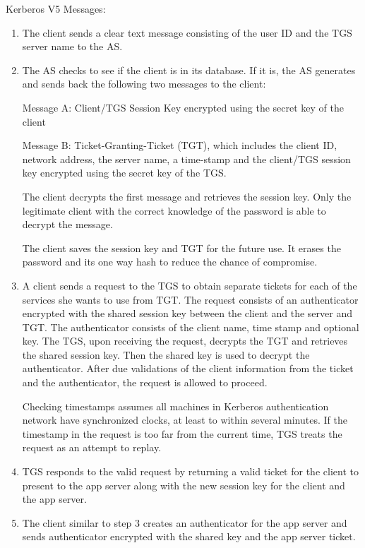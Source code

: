 \begin{multicols}{2}
Kerberos V5 Messages:
\begin{enumerate}
\item The client sends a clear text message consisting of the user ID and the TGS server name to the AS.
\item The AS checks to see if the client is in its database. If it is, the AS generates and sends back the following two messages to the client:

Message A: Client/TGS Session Key encrypted using the secret key of the client

Message B: Ticket-Granting-Ticket (TGT), which includes the client ID, network address, the server name, a time-stamp and the client/TGS session key encrypted using the secret key of the TGS.

The client decrypts the first message and retrieves the session key. Only the legitimate client with the correct knowledge of the password is able to decrypt the message.

The client saves the session key and TGT for the future use. It erases the password and its one way hash to reduce the chance of compromise.

\item A client sends a request to the TGS to obtain separate tickets for each of the services she wants to use from TGT. The request consists of an authenticator encrypted with the shared session key between the client and the server and TGT. The authenticator consists of the client name, time stamp and optional key. The TGS, upon receiving the request, decrypts the TGT and retrieves the shared session key. Then the shared key is used to decrypt the authenticator. After due validations of the client information from the ticket and the authenticator, the request is allowed to proceed.

Checking timestamps assumes all machines in Kerberos authentication network have synchronized clocks, at least to within several minutes. If the timestamp in the request is too far from the current time, TGS treats the request as an attempt to replay.

\item TGS responds to the valid request by returning a valid ticket for the client to present to the app server along with the new session key for the client and the app server.

\item The client similar to step 3 creates an authenticator for the app server and sends authenticator encrypted with the shared key and the app server ticket.


\end{enumerate}
\end{multicols}
